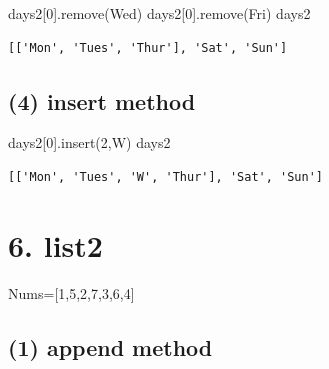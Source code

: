 \documentclass[
  letterpaper,
  DIV=11,
  numbers=noendperiod]{scrreprt}
\newenvironment{Shaded}{\begin{snugshade}}{\end{snugshade}}
\newcommand{\DecValTok}[1]{\textcolor[rgb]{0.68,0.00,0.00}{#1}}
\newcommand{\NormalTok}[1]{\textcolor[rgb]{0.00,0.23,0.31}{#1}}
\newcommand{\OperatorTok}[1]{\textcolor[rgb]{0.37,0.37,0.37}{#1}}
\newcommand{\StringTok}[1]{\textcolor[rgb]{0.13,0.47,0.30}{#1}}
\begin{document}
\begin{Shaded}
\begin{Highlighting}[]
\NormalTok{days2[}\DecValTok{0}\NormalTok{].remove(}\StringTok{\textquotesingle{}Wed\textquotesingle{}}\NormalTok{)}
\NormalTok{days2[}\DecValTok{0}\NormalTok{].remove(}\StringTok{\textquotesingle{}Fri\textquotesingle{}}\NormalTok{)}
\NormalTok{days2}
\end{Highlighting}
\end{Shaded}

\begin{verbatim}
[['Mon', 'Tues', 'Thur'], 'Sat', 'Sun']
\end{verbatim}

\subsection*{(4) insert method}\label{insert-method}

\begin{Shaded}
\begin{Highlighting}[]
\NormalTok{days2[}\DecValTok{0}\NormalTok{].insert(}\DecValTok{2}\NormalTok{,}\StringTok{\textquotesingle{}W\textquotesingle{}}\NormalTok{)}
\NormalTok{days2}
\end{Highlighting}
\end{Shaded}

\begin{verbatim}
[['Mon', 'Tues', 'W', 'Thur'], 'Sat', 'Sun']
\end{verbatim}

\section*{6. list2}\label{list2}


\begin{Shaded}
\begin{Highlighting}[]
\NormalTok{Nums}\OperatorTok{=}\NormalTok{[}\DecValTok{1}\NormalTok{,}\DecValTok{5}\NormalTok{,}\DecValTok{2}\NormalTok{,}\DecValTok{7}\NormalTok{,}\DecValTok{3}\NormalTok{,}\DecValTok{6}\NormalTok{,}\DecValTok{4}\NormalTok{]}
\end{Highlighting}
\end{Shaded}

\subsection*{(1) append method}\label{append-method}
\end{document}

